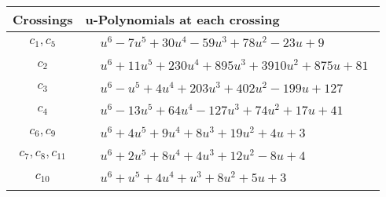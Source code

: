 \documentclass[1p]{elsarticle_modified}
\theoremstyle{definition}
\begin{document}
\begin{tabular}{m{50pt}|m{274pt}}
Crossings & \hspace{64pt}u-Polynomials at each crossing \\
\hline $$\begin{aligned}c_{1},c_{5}\end{aligned}$$&$\begin{aligned}
&u^6-7 u^5+30 u^4-59 u^3+78 u^2-23 u+9
\end{aligned}$\\
\hline $$\begin{aligned}c_{2}\end{aligned}$$&$\begin{aligned}
&u^6+11 u^5+230 u^4+895 u^3+3910 u^2+875 u+81
\end{aligned}$\\
\hline $$\begin{aligned}c_{3}\end{aligned}$$&$\begin{aligned}
&u^6- u^5+4 u^4+203 u^3+402 u^2-199 u+127
\end{aligned}$\\
\hline $$\begin{aligned}c_{4}\end{aligned}$$&$\begin{aligned}
&u^6-13 u^5+64 u^4-127 u^3+74 u^2+17 u+41
\end{aligned}$\\
\hline $$\begin{aligned}c_{6},c_{9}\end{aligned}$$&$\begin{aligned}
&u^6+4 u^5+9 u^4+8 u^3+19 u^2+4 u+3
\end{aligned}$\\
\hline $$\begin{aligned}c_{7},c_{8},c_{11}\end{aligned}$$&$\begin{aligned}
&u^6+2 u^5+8 u^4+4 u^3+12 u^2-8 u+4
\end{aligned}$\\
\hline $$\begin{aligned}c_{10}\end{aligned}$$&$\begin{aligned}
&u^6+u^5+4 u^4+u^3+8 u^2+5 u+3
\end{aligned}$\\
\hline
\end{tabular}\\~\\
\end{document}
